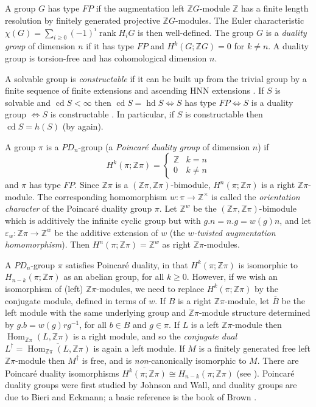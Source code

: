 \documentclass[12pt]{amsart}
\renewcommand{\geq}{\geqslant}
\theoremstyle{definition}
\newcommand{\Z}{\mathbb Z}
\DeclareMathOperator{\cd}{cd}
\DeclareMathOperator{\hd}{hd}
\DeclareMathOperator{\Hom}{Hom}
\DeclareMathOperator{\rank}{rank}
\newcommand{\ol}[1]{{\overline{#1}}}
\begin{document}
A group $G$ has type $FP$ if the augmentation left $\Z G$-module $\Z$ has 
a finite length resolution by finitely generated projective $\Z G$-modules.
The Euler characteristic  $\chi(G)=\sum_{i\geq0}(-1)^i\rank H_iG$
is then well-defined.
The group $G$ is a {\em duality group} of dimension $n$
if it has type $FP$ and $H^k(G; \Z G)=0$  for $k \not = n$.
A duality group is torsion-free and has cohomological dimension $n$.  

A solvable group is {\em constructable} if it can be built up 
from the trivial group by a finite sequence of finite extensions 
and ascending HNN extensions \cite{BB76}.
If $S$ is solvable and $\cd S<\infty$ then $\cd S=\hd S\Leftrightarrow{S}$ has type 
$FP\Leftrightarrow{S}$ is a duality group $\Leftrightarrow{S}$ is constructable \cite{Kr86}.
In particular,  if $S$ is constructable then $\cd S=h(S)$ (by  \cite[7.1]{Bieri} again).

A group $\pi$ is a $PD_n$-group (a {\em Poincar\'e duality group} 
of dimension $n$) if 
$$
H^k(\pi; \Z\pi) =
\begin{cases}
 \Z & k = n \\
 0 & k \not  = n
\end{cases}
$$
and $\pi$ has type $FP$.
Since $\Z\pi$ is a $(\Z\pi,\Z\pi)$-bimodule, 
$H^n(\pi; \Z\pi)$ is a right $\Z\pi$-module.   
The corresponding homomorphism $w: \pi \to \Z^\times$ is called
the {\it orientation character\/} of the Poincar\'e duality group $\pi$.
Let $\Z^w$ be the $(\Z\pi,\Z\pi)$-bimodule which is additively the infinite cyclic group 
but with  $g . n = n.g =  w(g) n$,
and let $\varepsilon_w:\Z\pi\to\Z^w$ be the additive extension of $w$ 
(the {\it $w$-twisted augmentation homomorphism}).
Then $H^n(\pi; \Z\pi) =\Z^w$ as right $\Z\pi$-modules.


A $PD_n$-group $\pi$ satisfies Poincar\'e duality,
in that $H^k(\pi;\Z\pi)$ is isomorphic to $H_{n-k}(\pi;\Z\pi)$ as an abelian group,
for all $k\geq0$.
However, if we wish an isomorphism of (left) $\Z\pi$-modules, 
we need to replace $H^k(\pi;\Z\pi)$ by the conjugate module,
defined in terms of $w$.
If $B$ is a right $\Z\pi$-module, let $\ol{B}$ be the left module with the same underlying group and $\Z\pi$-module structure determined by $g.b=w(g)rg^{-1}$, for all $b\in{B}$ and $g\in\pi$. 
If $L$ is a left $\Z\pi$-module then $\Hom_{\Z\pi}(L,\Z\pi)$ is a right module, and so the {\it conjugate dual}
$L^\dagger=\ol{\Hom_{\Z\pi}(L,\Z\pi)}$ is again a left module.
If $M$ is a finitely generated free left $\Z\pi$-module then $M^\dagger$ is free, and is {\it non}-canonically isomorphic to $M$.
There are Poincar\'e duality isomorphisms
$\ol{H^k(\pi;\Z\pi)}\cong H_{n-k}(\pi;\Z\pi)$ (see \cite{dh1}).
Poincar\'e duality groups were first studied by Johnson and Wall, 
and duality groups are due to Bieri and Eckmann; 
a basic reference is the book of Brown \cite{Brown}.
\end{document}
